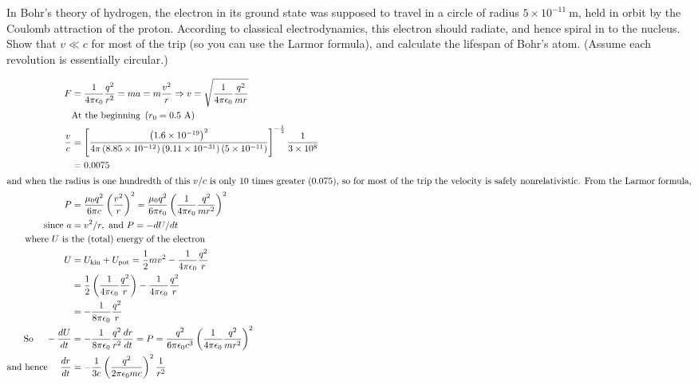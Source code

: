 \begin{exercise}
	 In Bohr's theory of hydrogen, the electron in its ground state was supposed to travel in a circle of radius $5 \times 10^{-11} \mathrm{~m}$, held in orbit by the Coulomb attraction of the proton. According to classical electrodynamics, this electron should radiate, and hence spiral in to the nucleus. Show that $v \ll c$ for most of the trip (so you can use the Larmor formula), and calculate the lifespan of Bohr's atom. (Assume each revolution is essentially circular.)
\end{exercise}
\begin{answer}
	\begin{align*}
F&=\frac{1}{4 \pi \epsilon_{0}} \frac{q^{2}}{r^{2}}=m a=m \frac{v^{2}}{r} \Rightarrow v=\sqrt{\frac{1}{4 \pi \epsilon_{0}} \frac{q^{2}}{m r}}\\
&\text{At the beginning }\left(r_{0}=0.5 \mathrm{~A}\right)\\
\frac{v}{c} &=\left[\frac{\left(1.6 \times 10^{-19}\right)^{2}}{4 \pi\left(8.85 \times 10^{-12}\right)\left(9.11 \times 10^{-31}\right)\left(5 \times 10^{-11}\right)}\right]^{-\frac{1}{2}} \frac{1}{3 \times 10^{8}} \\
&=0.0075\\
\intertext{and when the radius is one hundredth of this $v / c$ is only 10 times greater $(0.075)$, so for most of the trip the velocity is safely nonrelativistic. From the Larmor formula,}
P&=\frac{\mu_{0} q^{2}}{6 \pi c}\left(\frac{v^{2}}{r}\right)^{2}=\frac{\mu_{0} q^{2}}{6 \pi \epsilon_{0}}\left(\frac{1}{4 \pi \epsilon_{0}} \frac{q^{2}}{m r^{2}}\right)^{2}\\
\text{since }a&=v^{2} / r,\text{ and }P=-d U / d t\\
\text{ where $U$ is }&\text{the (total) energy of the electron}\\
	U &=U_{\mathrm{kin}}+U_{\mathrm{pot}}=\frac{1}{2} m v^{2}-\frac{1}{4 \pi \epsilon_{0}} \frac{q^{2}}{r} \\
	&=\frac{1}{2}\left(\frac{1}{4 \pi \epsilon_{0}} \frac{q^{2}}{r}\right)-\frac{1}{4 \pi \epsilon_{0}} \frac{q^{2}}{r} \\
	&=-\frac{1}{8 \pi \epsilon_{0}} \frac{q^{2}}{r}\\
\text{ So }\quad
-\frac{d U}{d t}&=-\frac{1}{8 \pi \epsilon_{0}} \frac{q^{2}}{r^{2}} \frac{d r}{d t}=P=\frac{q^{2}}{6 \pi \epsilon_{0} c^{3}}\left(\frac{1}{4 \pi \epsilon_{0}} \frac{q^{2}}{m r^{2}}\right)^{2}\\
\text{and hence }\quad
\frac{d r}{d t}&=-\frac{1}{3 c}\left(\frac{q^{2}}{2 \pi \epsilon_{0} m c}\right)^{2} \frac{1}{r^{2}}\\

\end{align*}
\end{answer}
